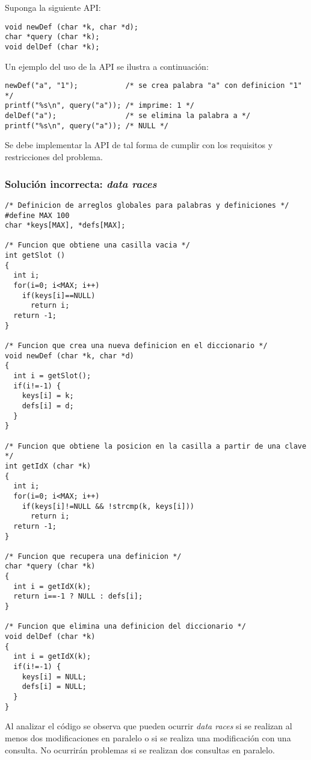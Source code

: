 Suponga la siguiente API:
\begin{lstlisting}
void newDef (char *k, char *d);
char *query (char *k);
void delDef (char *k);
\end{lstlisting}

Un ejemplo del uso de la API se ilustra a continuación:
\begin{lstlisting}
newDef("a", "1");           /* se crea palabra "a" con definicion "1" */
printf("%s\n", query("a")); /* imprime: 1 */
delDef("a");                /* se elimina la palabra a */
printf("%s\n", query("a")); /* NULL */
\end{lstlisting}

Se debe implementar la API de tal forma de cumplir con los requisitos y
restricciones del problema.

\subsubsection{Solución incorrecta: \emph{data races}}
\begin{lstlisting}
/* Definicion de arreglos globales para palabras y definiciones */
#define MAX 100
char *keys[MAX], *defs[MAX];

/* Funcion que obtiene una casilla vacia */
int getSlot ()
{
  int i;
  for(i=0; i<MAX; i++)
    if(keys[i]==NULL)
      return i;
  return -1;
}

/* Funcion que crea una nueva definicion en el diccionario */
void newDef (char *k, char *d)
{
  int i = getSlot();
  if(i!=-1) {
    keys[i] = k;
    defs[i] = d;
  }
}

/* Funcion que obtiene la posicion en la casilla a partir de una clave */
int getIdX (char *k)
{
  int i;
  for(i=0; i<MAX; i++)
    if(keys[i]!=NULL && !strcmp(k, keys[i]))
      return i;
  return -1;
}

/* Funcion que recupera una definicion */
char *query (char *k)
{
  int i = getIdX(k);
  return i==-1 ? NULL : defs[i];
}

/* Funcion que elimina una definicion del diccionario */
void delDef (char *k)
{
  int i = getIdX(k);
  if(i!=-1) {
    keys[i] = NULL;
    defs[i] = NULL;
  }
}
\end{lstlisting}

Al analizar el código se observa que pueden ocurrir \emph{data races} si se
realizan al menos dos modificaciones en paralelo o si se realiza una
modificación con una consulta. No ocurrirán problemas si se realizan dos
consultas en paralelo.

